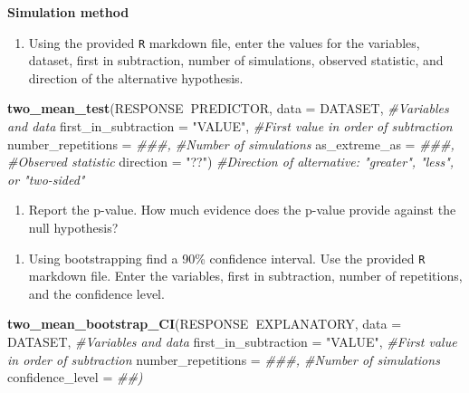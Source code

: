 \documentclass[
]{report}
\newenvironment{Shaded}{\begin{snugshade}}{\end{snugshade}}
\newcommand{\CommentTok}[1]{\textcolor[rgb]{0.56,0.35,0.01}{\textit{#1}}}
\newcommand{\DataTypeTok}[1]{\textcolor[rgb]{0.13,0.29,0.53}{#1}}
\newcommand{\KeywordTok}[1]{\textcolor[rgb]{0.13,0.29,0.53}{\textbf{#1}}}
\newcommand{\NormalTok}[1]{#1}
\newcommand{\OperatorTok}[1]{\textcolor[rgb]{0.81,0.36,0.00}{\textbf{#1}}}
\newcommand{\StringTok}[1]{\textcolor[rgb]{0.31,0.60,0.02}{#1}}
\providecommand{\tightlist}{%
  \setlength{\itemsep}{0pt}\setlength{\parskip}{0pt}}
\begin{document}
\textbf{Simulation method}

\begin{enumerate}
\def\labelenumi{\arabic{enumi}.}
\setcounter{enumi}{14}
\tightlist
\item
  Using the provided \texttt{R} markdown file, enter the values for the variables, dataset, first in subtraction, number of simulations, observed statistic, and direction of the alternative hypothesis.
\end{enumerate}

\begin{Shaded}
\begin{Highlighting}[]
\KeywordTok{two_mean_test}\NormalTok{(RESPONSE}\OperatorTok{~}\NormalTok{PREDICTOR, }\DataTypeTok{data =}\NormalTok{ DATASET,  }\CommentTok{#Variables and data}
                    \DataTypeTok{first_in_subtraction =} \StringTok{"VALUE"}\NormalTok{, }\CommentTok{#First value in order of subtraction}
                    \DataTypeTok{number_repetitions =} \CommentTok{###,  #Number of simulations}
                    \DataTypeTok{as_extreme_as =} \CommentTok{###,  #Observed statistic}
                    \DataTypeTok{direction =} \StringTok{"??"}\NormalTok{)  }\CommentTok{#Direction of alternative: "greater", "less", or "two-sided"}
\end{Highlighting}
\end{Shaded}

\vspace{1in}

\begin{enumerate}
\def\labelenumi{\arabic{enumi}.}
\setcounter{enumi}{15}
\tightlist
\item
  Report the p-value. How much evidence does the p-value provide against the null hypothesis?
\end{enumerate}

\vspace{1in}

\begin{enumerate}
\def\labelenumi{\arabic{enumi}.}
\setcounter{enumi}{16}
\tightlist
\item
  Using bootstrapping find a 90\% confidence interval. Use the provided \texttt{R} markdown file. Enter the variables, first in subtraction, number of repetitions, and the confidence level.
\end{enumerate}

\begin{Shaded}
\begin{Highlighting}[]
\KeywordTok{two_mean_bootstrap_CI}\NormalTok{(RESPONSE}\OperatorTok{~}\NormalTok{EXPLANATORY, }\DataTypeTok{data =}\NormalTok{ DATASET,  }\CommentTok{#Variables and data}
                      \DataTypeTok{first_in_subtraction =} \StringTok{"VALUE"}\NormalTok{, }\CommentTok{#First value in order of subtraction}
                      \DataTypeTok{number_repetitions =} \CommentTok{###,  #Number of simulations}
                      \DataTypeTok{confidence_level =} \CommentTok{##)}
\end{Highlighting}
\end{Shaded}
\end{document}
